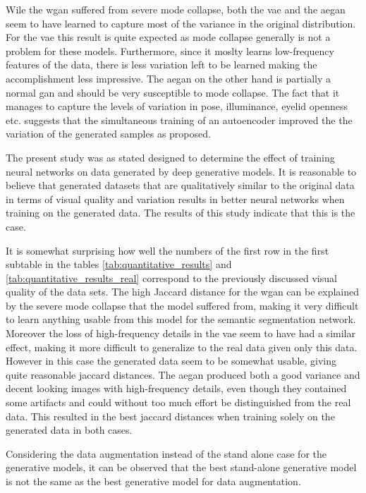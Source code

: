 Wile the \acrshort{wgan} suffered from severe mode collapse, both the \acrshort{vae} and the \acrshort{aegan} seem to have learned to capture most of the variance in the original distribution. For the \acrshort{vae} this result is quite expected as mode collapse generally is not a problem for these models. Furthermore, since it moslty learns low-frequency features of the data, there is less variation left to be learned making the accomplishment less impressive. The \acrshort{aegan} on the other hand is partially a normal \acrshort{gan} and should be very susceptible to mode collapse. The fact that it manages to capture the levels of variation in pose, illuminance, eyelid openness etc. suggests that the simultaneous training of an autoencoder improved the the variation of the generated samples as proposed.





The present study was as stated designed to determine the effect of training neural networks on data generated by deep generative models. It is reasonable to believe that generated datasets that are qualitatively similar to the original data in terms of visual quality and variation results in better neural networks when training on the generated data. The results of this study indicate that this is the case. 

It is somewhat surprising how well the numbers of the first row in the first subtable in the tables \ref{tab:quantitative_results} and \ref{tab:quantitative_results_real} correspond to the previously discussed visual quality of the data sets. 
The high Jaccard distance for the \acrshort{wgan} can be explained by the severe mode collapse that the model suffered from, making it very difficult to learn anything usable from this model for the semantic segmentation network. Moreover the loss of high-frequency details in the \acrshort{vae} seem to have had a similar effect, making it more difficult to generalize to the real data given only this data. However in this case the generated data seem to be somewhat usable, giving quite reasonable jaccard distances. The \acrshort{aegan} produced both a good variance and decent looking images with high-frequency details, even though they contained some artifacts and could without too much effort be distinguished from the real data. This resulted in the best jaccard distances when training solely on the generated data in both cases.

Considering the data augmentation instead of the stand alone case for the generative models, it can be observed that the best stand-alone generative model is not the same as the best generative model for data augmentation. 

